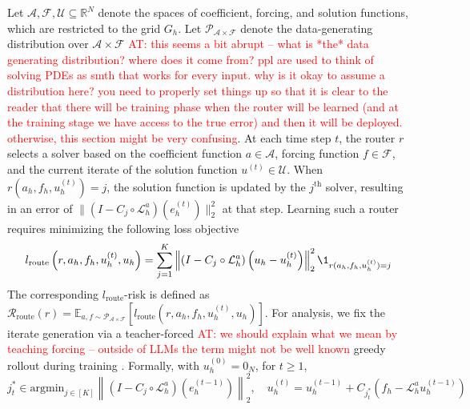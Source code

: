 \documentclass{article} %
\newcommand\ambuj[1]{\textcolor{red}{AT: #1}}
\begin{document}
Let $\mathcal{A}, \mathcal{F}, \mathcal{U} \subseteq \mathbb{R}^N$ denote the spaces of coefficient, forcing, and solution functions, which are restricted to the grid $G_h$. Let $\mathcal{P}_{\mathcal{A} \times \mathcal{F}}$ denote the data-generating distribution over $\mathcal{A} \times \mathcal{F}$ \ambuj{this seems a bit abrupt -- what is *the* data generating distribution? where does it come from? ppl are used to think of solving PDEs as smth that works for every input. why is it okay to assume a distribution here? you need to properly set things up so that it is clear to the reader that there will be training phase when the router will be learned (and at the training stage we have access to the true error) and then it will be deployed. otherwise, this section might be very confusing}. At each time step $t$, the router $r$ selects a solver based on the coefficient function $a \in \mathcal{A}$, forcing function $f \in \mathcal{F}$, and the current iterate of the solution function $u^{(t)} \in \mathcal{U}$. 
When $r(a_h, f_h, u^{(t)}_h) = j$, the solution function is updated by the $j^{\text{th}}$ solver, resulting in an error of $\|( I - C_{j} \circ  \mathcal{L}_{h}^a)(e^{(t)}_h)\|^2_2$ at that step. Learning such a router requires minimizing the following loss objective
\begin{equation} \label{eq:routerloss}
    l_{\text{route}}\left(r, a_h, f_h, u^{(t)}_h, u_h\right) = \sum_{j = 1}^K \left\|\left( I - C_{j} \circ \mathcal{L}_{h}^a\right)\left(u_h - u^{(t)}_h\right)\right\|^2_2\1_{r(a_h, f_h, u^{(t)}_h) = j}
\end{equation}
The corresponding $l_{\text{route}}$-risk is defined as $\mathcal{R}_{\text{route}}\left(r\right) = \mathbb{E}_{a, f \sim \mathcal{P}_{\mathcal{A} \times \mathcal{F}}}[l_{\text{route}}(r, a_h, f_h, u^{(t)}_h, u_h)]$.  
For analysis, we fix the iterate generation via a teacher-forced \ambuj{we should explain what we mean by teaching forcing -- outside of LLMs the term might not be well known} greedy rollout during training \citep{williams1989learning,lamb2016professor}. Formally, with $u_h^{(0)} = 0_N$, for $t \geq 1$, 
$$j^*_t \in \text{argmin}_{j \in [K]} \left\|\left( I - C_{j} \circ \mathcal{L}_{h}^a\right)\left(e^{(t - 1)}_h\right)\right\|^2_2, \quad u^{(t)}_h = u^{(t - 1)}_h + C_{j^{*}_t}\left(f_h - \mathcal{L}_h^a u_h^{(t - 1)}\right)$$
\end{document}
